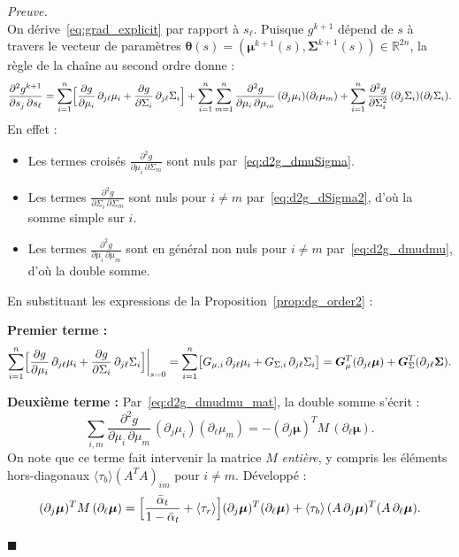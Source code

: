 \documentclass[12pt]{article}
\newcommand{\alt}{\bar\alpha_t}
\renewcommand{\qedsymbol}{$\blacksquare$}
\renewenvironment{proof}[1][\proofname]{%
  \par\medskip\noindent
  \textit{\color{proofgray}#1.}\enspace\ignorespaces
}{\hfill\qedsymbol\par\medskip}
\renewcommand{\proofname}{Preuve}
\begin{document}
\begin{proof}\\
On dérive~\eqref{eq:grad_explicit} par rapport à $s_\ell$. Puisque $g^{k+1}$ dépend de $s$ à travers le vecteur de paramètres $\boldsymbol{\theta}(s) = (\boldsymbol{\mu}^{k+1}(s), \boldsymbol{\Sigma}^{k+1}(s)) \in \mathbb{R}^{2n}$, la règle de la chaîne au second ordre donne :
\begin{equation*}
\frac{\partial^2 g^{k+1}}{\partial s_j\,\partial s_\ell} = \sum_{i=1}^n \Bigl[\frac{\partial g}{\partial \mu_i}\,\partial_{j\ell}\mu_i + \frac{\partial g}{\partial \Sigma_i}\,\partial_{j\ell}\Sigma_i\Bigr] + \sum_{i=1}^n\sum_{m=1}^n \frac{\partial^2 g}{\partial\mu_i\,\partial\mu_m}\,(\partial_j\mu_i)(\partial_\ell\mu_m) + \sum_{i=1}^n \frac{\partial^2 g}{\partial\Sigma_i^2}\,(\partial_j\Sigma_i)(\partial_\ell\Sigma_i).
\end{equation*}
En effet :
\begin{itemize}
\item Les termes croisés $\frac{\partial^2 g}{\partial\mu_i\,\partial\Sigma_m}$ sont nuls par~\eqref{eq:d2g_dmuSigma}.
\item Les termes $\frac{\partial^2 g}{\partial\Sigma_i\,\partial\Sigma_m}$ sont nuls pour $i \neq m$ par~\eqref{eq:d2g_dSigma2}, d'où la somme simple sur $i$.
\item Les termes $\frac{\partial^2 g}{\partial\mu_i\,\partial\mu_m}$ sont en général non nuls pour $i \neq m$ par~\eqref{eq:d2g_dmudmu}, d'où la double somme.
\end{itemize}

En substituant les expressions de la Proposition~\ref{prop:dg_order2} :

\medskip
\textbf{Premier terme :}
\begin{equation*}
\sum_{i=1}^n \Bigl[\frac{\partial g}{\partial\mu_i}\,\partial_{j\ell}\mu_i + \frac{\partial g}{\partial\Sigma_i}\,\partial_{j\ell}\Sigma_i\Bigr]\bigg|_{s=0} = \sum_{i=1}^n\bigl[G_{\mu,i}\,\partial_{j\ell}\mu_i + G_{\Sigma,i}\,\partial_{j\ell}\Sigma_i\bigr] = \boldsymbol{G}_\mu^T(\partial_{j\ell}\boldsymbol{\mu}) + \boldsymbol{G}_\Sigma^T(\partial_{j\ell}\boldsymbol{\Sigma}).
\end{equation*}

\textbf{Deuxième terme :} Par~\eqref{eq:d2g_dmudmu_mat}, la double somme s'écrit :
\begin{equation*}
\sum_{i,m} \frac{\partial^2 g}{\partial\mu_i\,\partial\mu_m}\,(\partial_j\mu_i)(\partial_\ell\mu_m) = -(\partial_j\boldsymbol{\mu})^T M\,(\partial_\ell\boldsymbol{\mu}).
\end{equation*}
On note que ce terme fait intervenir la matrice $M$ \emph{entière}, y compris les éléments hors-diagonaux $\langle\tau_b\rangle(A^TA)_{im}$ pour $i \neq m$. Développé :
\begin{equation*}
(\partial_j\boldsymbol{\mu})^T M\,(\partial_\ell\boldsymbol{\mu}) = \Bigl[\frac{\alt}{1-\alt} + \langle\tau_r\rangle\Bigr](\partial_j\boldsymbol{\mu})^T(\partial_\ell\boldsymbol{\mu}) + \langle\tau_b\rangle\,(A\,\partial_j\boldsymbol{\mu})^T(A\,\partial_\ell\boldsymbol{\mu}).
\end{equation*}


\end{proof}
\end{document}
